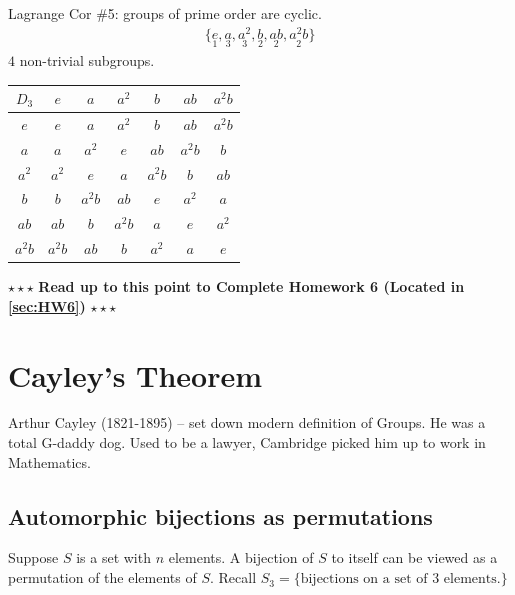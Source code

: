 \begin{enumerate}
    \noindent Lagrange Cor \#5: groups of prime order are cyclic. \\
    \begin{align}
        \{\underset{1}{e},\underset{3}{a},\underset{3}{a^2},\underset{2}{b},\underset{2}{ab},\underset{2}{a^2 b}\} \nonumber
    \end{align}
    $4$ non-trivial subgroups. \\
    \begin{tabular}{c|cccccc}
            $D_3$ & $e$ & $a$ & $a^2$& $b$ & $ab$ & $a^2 b$   \\ \hline
            $e$ & $e$ & $a$ & $a^2$& $b$ & $ab$ & $a^2 b$   \\
            $a$ & $a$ & $a^2$ & $e$& $ab$ & $a^2 b$ & $b$   \\
            $a^2$ & $a^2$ & $e$ & $a$& $a^2 b$ & $b$ & $ab$   \\
            $b$ & $b$ & $a^2 b$ & $ab$& $e$ & $a^2$ & $a$   \\
            $ab$ & $ab$ & $b$ & $a^2b$& $a$ & $e$ & $a^2$   \\
            $a^2 b$ & $a^2 b$ & $ab$ & $b$& $a^2$ & $a$ & $e$   \\
    \end{tabular}
\end{enumerate}
\steezybreak
\begin{tcolorbox}
    \begin{center}
        $\star\star\star$ \textbf{Read up to this point to Complete Homework 6 (Located in
        \ref{sec:HW6})} $\star\star\star$
    \end{center}
    \end{tcolorbox}
\steezybreak
\section{Cayley's Theorem}
Arthur Cayley (1821-1895) -- set down modern definition of Groups. He was a total G-daddy dog. Used
to be a lawyer, Cambridge picked him up to work in Mathematics.

\subsection*{Automorphic bijections as permutations}
Suppose $S$ is a set with $n$ elements. A bijection of $S$ to itself can be viewed as a permutation
of the elements of $S$. Recall $S_3=\{\text{bijections on a set of $3$ elements.}\}$\steezybreak

